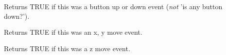 \label{wxjoystickeventisbutton}


Returns TRUE if this was a button up or down event ({\it not} 'is any button down?').

\label{wxjoystickeventismove}


Returns TRUE if this was an x, y move event.

\label{wxjoystickeventiszmove}


Returns TRUE if this was a z move event.

